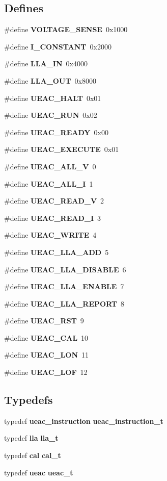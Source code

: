 \subsection*{Defines}
\begin{CompactItemize}
\item 
\#define {\bf VOLTAGE\_\-SENSE}~0x1000
\item 
\#define {\bf I\_\-CONSTANT}~0x2000
\item 
\#define {\bf LLA\_\-IN}~0x4000
\item 
\#define {\bf LLA\_\-OUT}~0x8000
\item 
\#define {\bf UEAC\_\-HALT}~0x01
\item 
\#define {\bf UEAC\_\-RUN}~0x02
\item 
\#define {\bf UEAC\_\-READY}~0x00
\item 
\#define {\bf UEAC\_\-EXECUTE}~0x01
\item 
\#define {\bf UEAC\_\-ALL\_\-V}~0
\item 
\#define {\bf UEAC\_\-ALL\_\-I}~1
\item 
\#define {\bf UEAC\_\-READ\_\-V}~2
\item 
\#define {\bf UEAC\_\-READ\_\-I}~3
\item 
\#define {\bf UEAC\_\-WRITE}~4
\item 
\#define {\bf UEAC\_\-LLA\_\-ADD}~5
\item 
\#define {\bf UEAC\_\-LLA\_\-DISABLE}~6
\item 
\#define {\bf UEAC\_\-LLA\_\-ENABLE}~7
\item 
\#define {\bf UEAC\_\-LLA\_\-REPORT}~8
\item 
\#define {\bf UEAC\_\-RST}~9
\item 
\#define {\bf UEAC\_\-CAL}~10
\item 
\#define {\bf UEAC\_\-LON}~11
\item 
\#define {\bf UEAC\_\-LOF}~12
\end{CompactItemize}
\subsection*{Typedefs}
\begin{CompactItemize}
\item 
typedef {\bf ueac\_\-instruction} {\bf ueac\_\-instruction\_\-t}
\item 
typedef {\bf lla} {\bf lla\_\-t}
\item 
typedef {\bf cal} {\bf cal\_\-t}
\item 
typedef {\bf ueac} {\bf ueac\_\-t}
\end{CompactItemize}
